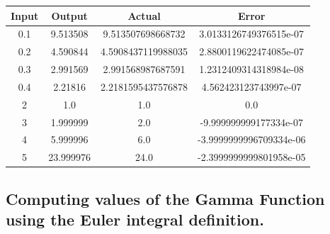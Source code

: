 \documentclass[12pt]{article}
\begin{document}
%
%
%
%
%
%
\begin{center}
	\begin{tabular}{ | c c c c | }
		\hline
		\hline
		Input & Output & Actual & Error\\
		\hline
		\hline
		0.1 & 9.513508 & 9.513507698668732 & 3.0133126749376515e-07\\
		\hline
		0.2 & 4.590844 & 4.5908437119988035 & 2.8800119622474085e-07\\
		\hline
		0.3 & 2.991569 & 2.991568987687591 & 1.2312409314318984e-08\\
		\hline
		0.4 & 2.21816 & 2.2181595437576878 & 4.562423123743997e-07\\
		\hline
		2 & 1.0 & 1.0 & 0.0\\
		\hline
		3 & 1.999999 & 2.0 & -9.999999999177334e-07\\
		\hline
		4 & 5.999996 & 6.0 & -3.9999999996709334e-06\\
		\hline
		5 & 23.999976 & 24.0 & -2.3999999999801958e-05\\
		\hline
		\hline
	\end{tabular}
\end{center}

\subsection{Computing values of the Gamma Function using the Euler integral definition.}
\end{document}
